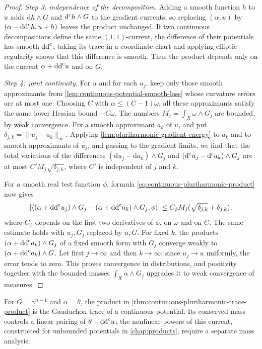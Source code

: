 \begin{proof}
\medskip\noindent\emph{Step 3: independence of the decomposition.} Adding a smooth function $h$ to $u$ adds $\mathrm{d}h\wedge G$ and $\mathrm d^{\mathrm c} h\wedge G$ to the gradient currents, so replacing $(\alpha,u)$ by $(\alpha-\mathrm{dd}^{\mathrm{c}} h,u+h)$ leaves the product unchanged. If two continuous decompositions define the same $(1,1)$-current, the difference of their potentials has smooth $\mathrm{dd}^{\mathrm{c}}$; taking its trace in a coordinate chart and applying elliptic regularity shows that this difference is smooth. Thus the product depends only on the current $\alpha+\mathrm{dd}^{\mathrm{c}} u$ and on $G$.

\medskip\noindent\emph{Step 4: joint continuity.} For $u$ and for each $u_j$, keep only those smooth approximants from \cref{lem:continuous-potential-smooth-loss} whose curvature errors are at most one. Choosing $C$ with $\alpha\leq(C-1)\omega$, all these approximants satisfy the same lower Hessian bound $-C\omega$. The numbers $M_j=\int_X\omega\wedge G_j$ are bounded, by weak convergence. Fix a smooth approximant $a_k$ of $u$, and put $\delta_{j,k}=\|u_j-a_k\|_\infty$. Applying \cref{lem:pluriharmonic-gradient-energy} to $a_k$ and to smooth approximants of $u_j$, and passing to the gradient limits, we find that the total variations of the differences $(\mathrm{d}u_j-\mathrm{d}a_k)\wedge G_j$ and $(\mathrm d^{\mathrm c} u_j-\mathrm d^{\mathrm c} a_k)\wedge G_j$ are at most $C'M_j\sqrt{\delta_{j,k}}$, where $C'$ is independent of $j$ and $k$.

For a smooth real test function $\phi$, formula \eqref{eq:continuous-pluriharmonic-product} now gives
\[
 \left|\left\langle(\alpha+\mathrm{dd}^{\mathrm{c}} u_j)\wedge G_j
       -(\alpha+\mathrm{dd}^{\mathrm{c}} a_k)\wedge G_j,\phi\right\rangle\right|
 \leq C_\phi M_j(\sqrt{\delta_{j,k}}+\delta_{j,k}),
\]
where $C_\phi$ depends on the first two derivatives of $\phi$, on $\omega$ and on $C$. The same estimate holds with $u_j,G_j$ replaced by $u,G$. For fixed $k$, the products $(\alpha+\mathrm{dd}^{\mathrm{c}} a_k)\wedge G_j$ of a fixed smooth form with $G_j$ converge weakly to $(\alpha+\mathrm{dd}^{\mathrm{c}} a_k)\wedge G$. Let first $j\to\infty$ and then $k\to\infty$; since $u_j\to u$ uniformly, the error tends to zero. This proves convergence in distributions, and positivity together with the bounded masses $\int_X\alpha\wedge G_j$ upgrades it to weak convergence of measures.
\end{proof}

For $G=\gamma^{n-1}$ and $\alpha=\theta$, the product in \cref{thm:continuous-pluriharmonic-trace-product} is the Gauduchon trace of a continuous potential. Its conserved mass controls a linear pairing of $\theta+\mathrm{dd}^{\mathrm{c}} u$; the nonlinear powers of this current, constructed for unbounded potentials in \cref{chap:products}, require a separate mass analysis.
